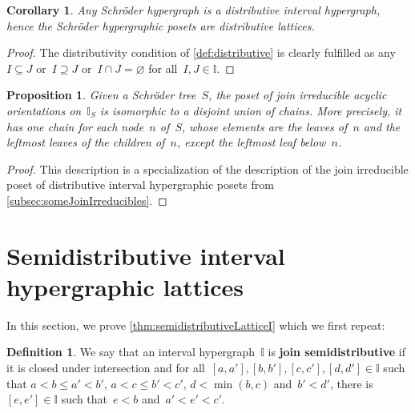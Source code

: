 \documentclass[reqno]{amsart}
\newtheorem{corollary}[theorem]{Corollary}
\newtheorem{proposition}[theorem]{Proposition}
\theoremstyle{definition}
\newtheorem{definition}[theorem]{Definition}
\newcommand{\defn}[1]{\textbf{\textsf{\color{PineGreen} #1}}} %
\newcommand{\II}{\mathbb I} %
\begin{document}
\begin{corollary}
Any Schr\"oder hypergraph is a distributive interval hypergraph, hence the Schr\"oder hypergraphic posets are distributive lattices.
\end{corollary}

\begin{proof}
The distributivity condition of \cref{def:distributive} is clearly fulfilled as any~$I \subseteq J$ or~$I \supseteq J$ or~$I \cap J = \varnothing$ for all~$I,J \in \II$.
\end{proof}

\begin{proposition}
Given a Schr\"oder tree~$S$, the poset of join irreducible acyclic orientations on~$\II_S$ is isomorphic to a disjoint union of chains.
More precisely, it has one chain for each node~$n$ of~$S$, whose elements are the leaves of~$n$ and the leftmost leaves of the children of~$n$, except the leftmost leaf below~$n$.
\end{proposition}

\begin{proof}
This description is a specialization of the description of the join irreducible poset of distributive interval hypergraphic posets from \cref{subsec:someJoinIrreducibles}.
\end{proof}


\section{Semidistributive interval hypergraphic lattices}
\label{sec:semidistributive}

In this section, we prove \cref{thm:semidistributiveLatticeI} which we first repeat:

\begin{definition}
\label{def:semidistributive}
We say that an interval hypergraph~$\II$ is \defn{join semidistributive} if it is closed under intersection and
for all~$[a,a'], [b,b'], [c,c'], [d,d'] \in \II$ such that ${a < b \le a' < b'}$, $a < c \le b' < c'$, $d < \min(b, c)$ and~$b' < d'$, there is~$[e,e'] \in \II$ such that~$e < b$ and~${a' < e' < c'}$.
\end{definition}
\end{document}
